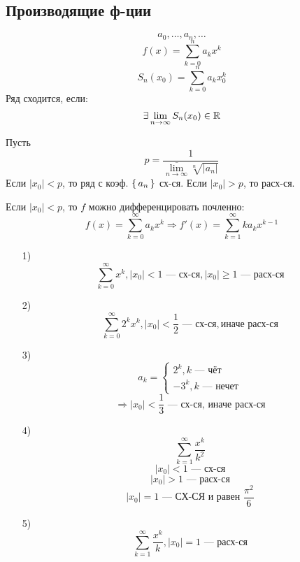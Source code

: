 \subsection{Производящие ф-ции}
\[
a_0, \ldots, a_n, \ldots
\]
\[
f(x) = \sum_{k = 0}^{n} a_k x^{k}
\]
\[
S_n(x_0) = \sum_{k = 0}^{n} a_k x_0^{k}
\]
Ряд сходится, если:
\[
\exists \lim_{n\to \infty} S_n(x_0) \in \mathbb{R}
\]
\begin{theorem}
\label{th:gen_functions_1}
Пусть
\[
  p = \frac{1}{\overline{\lim_{n\to\infty}} \sqrt[n]{\left|a_n\right|}}
\]
Если $\left|x_0\right| < p$, то ряд с коэф. $\set{a_n}$ сх-ся. Если $\left|x_0\right| > p$, то расх-ся.
\begin{note}
Если $\left|x_0\right| < p$, то $f$ можно дифференцировать почленно:
\[
  f(x) = \sum_{k = 0}^{\infty} a_k x^{k} \Rightarrow f'(x) = \sum_{k = 1}^{\infty} ka_k x^{k - 1}
\]
\end{note}
\end{theorem}
\begin{example}
\begin{itemize}
  \item [1) ] \[
  \sum_{k = 0}^{\infty} x^{k}, \left|x_0\right| < 1 \text{ --- сх-ся}, \left|x_0\right| \geq 1 \text{ --- расх-ся}
  \]
\item [2) ] \[
  \sum_{k = 0}^{\infty} 2^{k} x^{k}, \left|x_0\right| < \frac{1}{2} \text{ --- сх-ся}, \text{иначе расх-ся}
\] 
\item [3) ] \[
a_k = \begin{cases}
2^{k}, k \text{ --- чёт} \\
-3^{k}, k \text{ --- нечет}
\end{cases}
\]
\[
\Rightarrow \left|x_0\right| < \frac{1}{3} \text{ --- сх-ся, иначе расх-ся}
\]
\item [4) ] \[
  \sum_{k = 1}^{\infty} \frac{x^{k}}{k^{2}}
\]
\[
  \left|x_0\right| < 1 \text{ --- сх-ся}
\]
\[
  \left|x_0\right| > 1 \text{ --- расх-ся}
\]
\[
  \left|x_0\right| = 1 \text{ --- СХ-СЯ и равен $\frac{\pi^{2}}{6}$}
\]
\item [5) ] \[
  \sum_{k = 1}^{\infty} \frac{x^{k}}{k}, \left|x_0\right| = 1 \text{ --- расх-ся}
\]
\end{itemize}
\end{example} 

